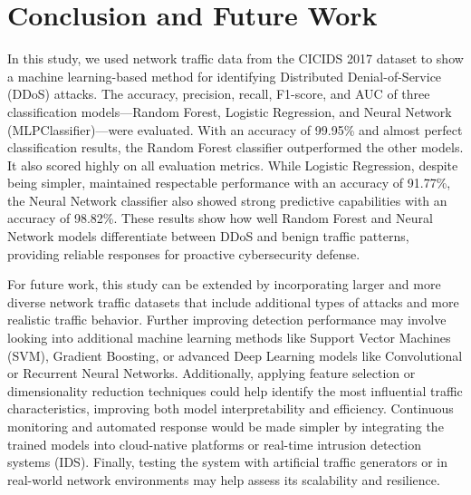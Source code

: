 \documentclass[conference]{IEEEtran}
\begin{document}
\section{Conclusion and Future Work}

In this study, we used network traffic data from the CICIDS 2017 dataset to show a machine learning-based method for identifying Distributed Denial-of-Service (DDoS) attacks. The accuracy, precision, recall, F1-score, and AUC of three classification models—Random Forest, Logistic Regression, and Neural Network (MLPClassifier)—were evaluated. With an accuracy of 99.95\% and almost perfect classification results, the Random Forest classifier outperformed the other models. It also scored highly on all evaluation metrics. While Logistic Regression, despite being simpler, maintained respectable performance with an accuracy of 91.77\%, the Neural Network classifier also showed strong predictive capabilities with an accuracy of 98.82\%. These results show how well Random Forest and Neural Network models differentiate between DDoS and benign traffic patterns, providing reliable responses for proactive cybersecurity defense.

For future work, this study can be extended by incorporating larger and more diverse network traffic datasets that include additional types of attacks and more realistic traffic behavior. Further improving detection performance may involve looking into additional machine learning methods like Support Vector Machines (SVM), Gradient Boosting, or advanced Deep Learning models like Convolutional or Recurrent Neural Networks. Additionally, applying feature selection or dimensionality reduction techniques could help identify the most influential traffic characteristics, improving both model interpretability and efficiency. Continuous monitoring and automated response would be made simpler by integrating the trained models into cloud-native platforms or real-time intrusion detection systems (IDS). Finally, testing the system with artificial traffic generators or in real-world network environments may help assess its scalability and resilience. 
\end{document}
